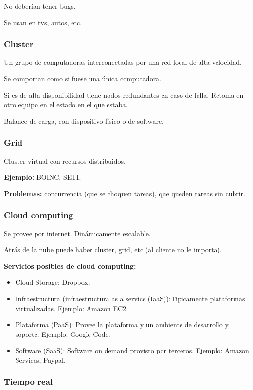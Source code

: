 \documentclass[a4paper, twoside]{article}
\begin{document}
No deberían tener bugs.

Se usan en tvs, autos, etc.

\subsubsection{Cluster}

Un grupo de computadoras interconectadas por una red local de alta velocidad.

Se comportan como si fuese una única computadora.

Si es de alta disponibilidad tiene nodos redundantes en caso de falla.
Retoma en otro equipo en el estado en el que estaba.

Balance de carga, con dispositivo físico o de software.

\subsubsection{Grid}

Cluster virtual con recursos distribuidos.

\textbf{Ejemplo:} BOINC, SETI.

\textbf{Problemas:} concurrencia (que se choquen tareas), que queden tareas sin
cubrir.

\subsubsection{Cloud computing}

Se provee por internet. Dinámicamente escalable.

Atrás de la nube puede haber cluster, grid, etc (al cliente no le importa).

\textbf{Servicios posibles de cloud computing:}

\begin{itemize}
  \item Cloud Storage: Dropbox.
  \item Infraestructura (infraestructura as a service (IaaS)):Típicamente
  plataformas virtualizadas. Ejemplo: Amazon EC2
  \item Plataforma (PaaS): Provee la plataforma y un ambiente de desarrollo y
  soporte. Ejemplo: Google Code.
  \item Software (SaaS): Software on demand provisto por terceros.
  Ejemplo: Amazon Services, Paypal.
\end{itemize}

\subsubsection{Tiempo real}
\end{document}
